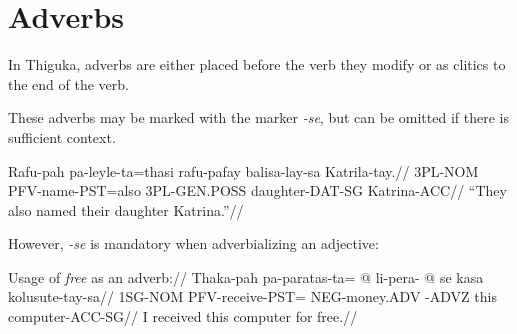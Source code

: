 \section{Adverbs}
In Thiguka, adverbs are either placed before the verb they modify or as clitics to the end of the verb.

These adverbs may be marked with the marker \textit{-se}, but can be omitted if there is sufficient context.

\ex
\begingl
\gla   Rafu-pah pa-leyle-ta=thasi rafu-pafay   balisa-lay-sa   Katrila-tay.//
\glb   3PL-NOM  PFV-name-PST=also 3PL-GEN.POSS daughter-DAT-SG Katrina-ACC//
\glft  ``They also named their daughter Katrina.''//
\endgl
\xe


However, \textit{-se} is mandatory when adverbializing an adjective:

\ex
\begingl
\glpreamble Usage of \textit{free} as an adverb:// 
\gla   Thaka-pah pa-paratas-ta=   @ li-pera-      @ se      kasa kolusute-tay-sa//
\glb   1SG-NOM   PFV-receive-PST=   NEG-money.ADV   -ADVZ   this computer-ACC-SG//
\glft  I received this computer for free.//
\endgl
\xe
